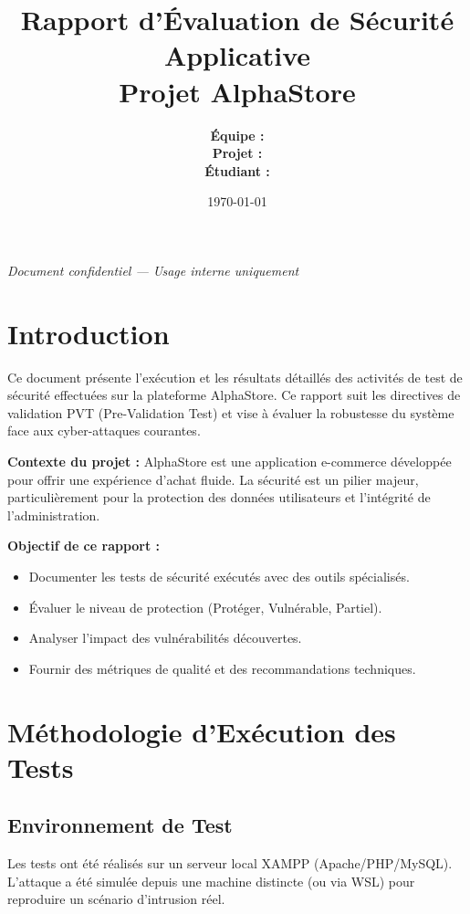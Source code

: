 \documentclass[a4paper,12pt]{article}
\title{
    \vspace{2cm}
    \Huge \textbf{Rapport d'Évaluation de Sécurité Applicative}\\[0.6cm]
    \Large Projet AlphaStore
    }
\author{
    \textbf{Équipe :} \student{Ahmed-Jeday}\\[0.2cm]
    \textbf{Projet :} \student{AlphaStore}\\[0.2cm]
    \textbf{Étudiant :} \student{Ahmed}
    }
\date{\today}
\begin{document}
    \maketitle
    \thispagestyle{empty}
    \vfill
    \begin{center}
    \textit{Document confidentiel --- Usage interne uniquement}
    \end{center}
    \newpage

    \tableofcontents
    \thispagestyle{fancy}
    \newpage

    \section{Introduction}

    Ce document présente l'exécution et les résultats détaillés des activités de test de sécurité effectuées sur la plateforme AlphaStore. Ce rapport suit les directives de validation PVT (Pre-Validation Test) et vise à évaluer la robustesse du système face aux cyber-attaques courantes.

    \textbf{Contexte du projet :}
    AlphaStore est une application e-commerce développée pour offrir une expérience d'achat fluide. La sécurité est un pilier majeur, particulièrement pour la protection des données utilisateurs et l'intégrité de l'administration.

    \textbf{Objectif de ce rapport :}
    \begin{itemize}[leftmargin=2em,itemsep=0.3em]
    \item Documenter les tests de sécurité exécutés avec des outils spécialisés.
    \item Évaluer le niveau de protection (Protéger, Vulnérable, Partiel).
    \item Analyser l'impact des vulnérabilités découvertes.
    \item Fournir des métriques de qualité et des recommandations techniques.
    \end{itemize}

    \section{Méthodologie d'Exécution des Tests}

    \subsection{Environnement de Test}
    Les tests ont été réalisés sur un serveur local XAMPP (Apache/PHP/MySQL). L'attaque a été simulée depuis une machine distincte (ou via WSL) pour reproduire un scénario d'intrusion réel.
\end{document}
